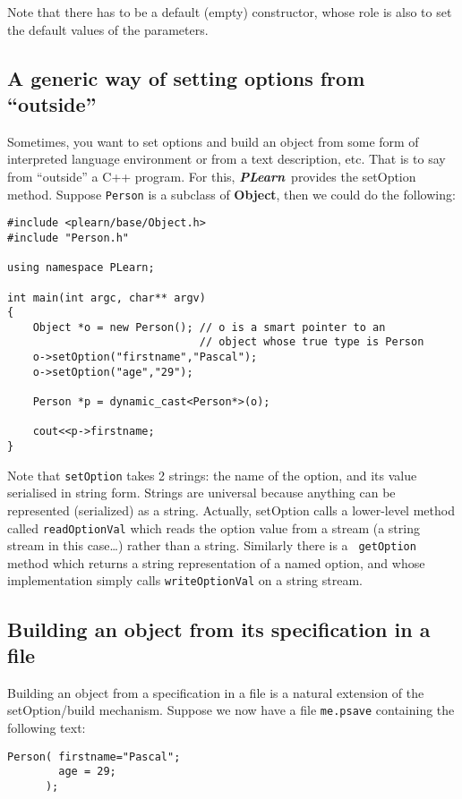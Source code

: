 \documentclass[11pt]{book}
\newcommand{\PLearn}{{\bf \it PLearn}}
\newcommand{\Object}{{\bf Object}}
\begin{document}
Note that there has to be a default (empty) constructor, whose role is also
to set the default values of the parameters.


\subsection{A generic way of setting options from ``outside''}

Sometimes, you want to set options and build an object from some
form of interpreted language environment or from a text description,
etc. That is to say from ``outside'' a C++ program. For this, \PLearn\ 
provides the setOption method. Suppose {\tt Person} is a subclass of
\Object, then we could do the following:

\begin{verbatim}
#include <plearn/base/Object.h>
#include "Person.h"

using namespace PLearn;

int main(int argc, char** argv)
{
    Object *o = new Person(); // o is a smart pointer to an
                              // object whose true type is Person
    o->setOption("firstname","Pascal");
    o->setOption("age","29");

    Person *p = dynamic_cast<Person*>(o);

    cout<<p->firstname;
}
\end{verbatim}

Note that {\tt setOption} takes 2 strings: the name of the option, and
its value serialised in string form. Strings are universal because
anything can be represented (serialized) as a string. Actually,
setOption calls a lower-level method called {\tt readOptionVal}
which reads the option value from a stream (a string stream in
this case\ldots) rather than a string. Similarly there is a {\tt
getOption} method which returns a string representation of a named
option, and whose implementation simply calls {\tt writeOptionVal}
on a string stream.


\subsection{Building an object from its specification in a file}

Building an object from a specification in a file is a natural
extension of the setOption/build mechanism.
Suppose we now have a file {\tt me.psave} containing the following text:

\begin{verbatim}
Person( firstname="Pascal"; 
        age = 29;
      );
\end{verbatim}
\end{document}
